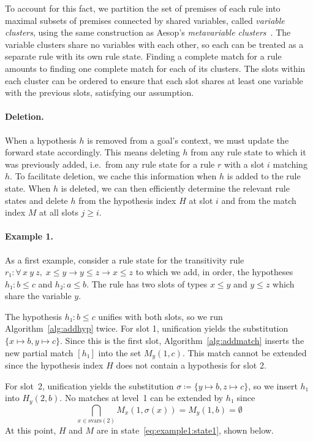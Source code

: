 \documentclass[runningheads,leqno]{llncs}
\newcommand{\para}[1]{\paragraph{\bfseries\upshape #1}}
\newcommand{\All}[2]{\ensuremath{\forall\, #1,\; #2}}
\newcommand{\vars}{\ensuremath{\mathrm{svars}}}
\begin{document}
To account for this fact, we partition the set of premises of each rule into maximal subsets of premises connected by shared variables, called \emph{variable clusters}, using the same construction as Aesop's \emph{metavariable clusters}~\cite{Aesop}.
The variable clusters share no variables with each other, so each can be treated as a separate rule with its own rule state.
Finding a complete match for a rule amounts to finding one complete match for each of its clusters.
The slots within each cluster can be ordered to ensure that each slot shares at least one variable with the previous slots, satisfying our assumption.

\para{Deletion.}
When a hypothesis $h$ is removed from a goal's context, we must update the forward state accordingly.
This means deleting $h$ from any rule state to which it was previously added, i.e.\ from any rule state for a rule $r$ with a slot $i$ matching $h$.
To facilitate deletion, we cache this information when $h$ is added to the rule state.
When $h$ is deleted, we can then efficiently determine the relevant rule states and delete $h$ from the hypothesis index $H$ at slot $i$ and from the match index $M$ at all slots $j ≥ i$.

\para{Example 1.}
As a first example, consider a rule state for the transitivity rule $r₁ : \All{x~y~z}{x ≤ y → y ≤ z → x ≤ z}$ to which we add, in order, the hypotheses
$h₁ : b ≤ c$ and $h₂ : a ≤ b$.
The rule has two slots of types $x ≤ y$ and $y ≤ z$ which share the variable $y$.

The hypothesis $h₁ : b ≤ c$ unifies with both slots, so we run Algorithm~\ref{alg:addhyp} twice.
For slot 1, unification yields the substitution $\{x ↦ b, y ↦ c\}$.
Since this is the first slot, Algorithm~\ref{alg:addmatch} inserts the new partial match $[h₁]$ into the set $M_{y}(1, c)$.
This match cannot be extended since the hypothesis index $H$ does not contain a hypothesis for slot 2.

For slot~2, unification yields the substitution $σ ≔ \{y ↦ b, z ↦ c\}$, so we insert $h₁$ into $H_{y}(2, b)$.
No matches at level~1 can be extended by $h₁$ since
\[
  \bigcap_{x \in \vars(2)} M_{x}(1, σ(x)) = M_{y}(1, b) = \emptyset
\]
At this point, $H$ and $M$ are in state~\eqref{eq:example1:state1}, shown below.
\end{document}
